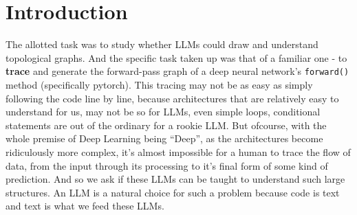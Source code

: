 \documentclass[twoside,english]{article}
\begin{document}
\section{Introduction}
The allotted task was to study whether LLMs could draw and understand topological graphs. And
the specific task taken up was that of a familiar one - to \textbf{trace} and generate the forward-pass graph of a
deep neural network's \texttt{forward()} method (specifically pytorch). This tracing may not be as easy as simply following
the code line by line, because architectures that are relatively easy to understand for us, may not be so for LLMs,
even simple loops, conditional statements are out of the ordinary for a rookie LLM. But ofcourse, with the whole premise
of Deep Learning being ``Deep'', as the architectures become ridiculously more complex, it's almost impossible for a human
to trace the flow of data, from the input through its processing to it's final form of some kind of prediction. And so we
ask if these LLMs can be taught to understand such large structures.
An LLM is a natural choice for such a problem because code is text and text is what we feed these LLMs.
\end{document}
